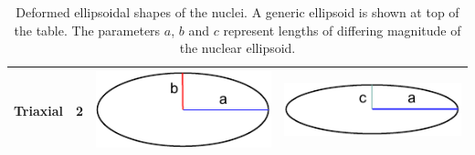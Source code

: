 \begin{table}[ht]
\begin{tabular}{|c|c|c|c|}
        Triaxial & 2                                                              &   \includegraphics[scale=0.7]{Chapters/Figures/ellipse_triaxial_1.pdf}  &     \includegraphics[scale=0.7]{Chapters/Figures/ellipse_triaxial_2.pdf}      \\ \hline
        \end{tabular}
    \caption{Deformed ellipsoidal shapes of the nuclei. A generic ellipsoid is shown at top of the table. The parameters $a$, $b$ and $c$ represent lengths of differing magnitude of the nuclear ellipsoid.}
    \label{table-ellipsoidal-shapes}
    \end{table}